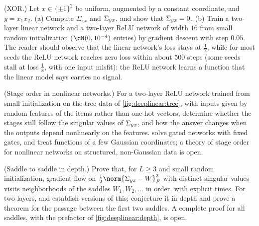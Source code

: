 \begin{refsection}
\begin{exercises}
\item \simulation (XOR.) Let $x\in\{\pm1\}^2$ be uniform, augmented by a constant coordinate, and $y=x_1x_2$. (a) Compute $\Sigma_{xx}$ and $\Sigma_{yx}$, and show that $\Sigma_{yx}=0$. (b) Train a two-layer linear network and a two-layer ReLU network of width $16$ from small random initialization ($\cN(0,10^{-4})$ entries) by gradient descent with step $0.05$. The reader should observe that the linear network's loss stays at $\frac12$, while for most seeds the ReLU network reaches zero loss within about $500$ steps (some seeds stall at loss $\frac18$, with one input misfit): the ReLU network learns a function that the linear model says carries no signal.\label{ex:deeplinear:xor}

\item \research (Stage order in nonlinear networks.) For a two-layer ReLU network trained from small initialization on the tree data of \cref{fig:deeplinear:tree}, with inputs given by random features of the items rather than one-hot vectors, determine whether the stages still follow the singular values of $\Sigma_{yx}$, and how the answer changes when the outputs depend nonlinearly on the features. \Textcite{SaxeSodhaniLewallen2022} solve gated networks with fixed gates, and \textcite{AbbeEtAl2023} treat functions of a few Gaussian coordinates; a theory of stage order for nonlinear networks on structured, non-Gaussian data is open.\label{ex:deeplinear:research-order}

\item \research (Saddle to saddle in depth.) Prove that, for $L\ge3$ and small random initialization, gradient flow on $\frac12\norm{\dlS-W}_F^2$ with distinct singular values visits neighborhoods of the saddles $W_1,W_2,\dots$ in order, with explicit times. For two layers, \textcite{LiLuoLyu2021} and \textcite{GidelEtAl2019} establish versions of this; \textcite{JacotEtAl2021} conjecture it in depth and prove a theorem for the passage between the first two saddles. A complete proof for all saddles, with the prefactor of \cref{fig:deeplinear:depth}, is open.\label{ex:deeplinear:research-saddle}
\end{exercises}


\end{refsection}

